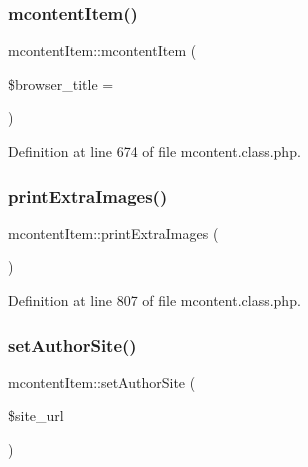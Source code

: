 \hypertarget{classmcontentItem_a9cf9b439a6c29b1354b298ab6023ea3e}{}\label{classmcontentItem_a9cf9b439a6c29b1354b298ab6023ea3e} 
\subsubsection{\texorpdfstring{mcontent\+Item()}{mcontentItem()}}
{\footnotesize\ttfamily mcontent\+Item\+::mcontent\+Item (\begin{DoxyParamCaption}\item[{}]{\$browser\+\_\+title = {\ttfamily \textquotesingle{}\textquotesingle{}} }\end{DoxyParamCaption})}



Definition at line 674 of file mcontent.\+class.\+php.

\hypertarget{classmcontentItem_a0cd7ac4bbaf7e7561f5597920c691f9d}{}\label{classmcontentItem_a0cd7ac4bbaf7e7561f5597920c691f9d} 
\subsubsection{\texorpdfstring{print\+Extra\+Images()}{printExtraImages()}}
{\footnotesize\ttfamily mcontent\+Item\+::print\+Extra\+Images (\begin{DoxyParamCaption}{ }\end{DoxyParamCaption})}



Definition at line 807 of file mcontent.\+class.\+php.

\hypertarget{classmcontentItem_adaa9ad60dd8f5373b9f2258a6effe70c}{}\label{classmcontentItem_adaa9ad60dd8f5373b9f2258a6effe70c} 
\subsubsection{\texorpdfstring{set\+Author\+Site()}{setAuthorSite()}}
{\footnotesize\ttfamily mcontent\+Item\+::set\+Author\+Site (\begin{DoxyParamCaption}\item[{}]{\$site\+\_\+url }\end{DoxyParamCaption})}



